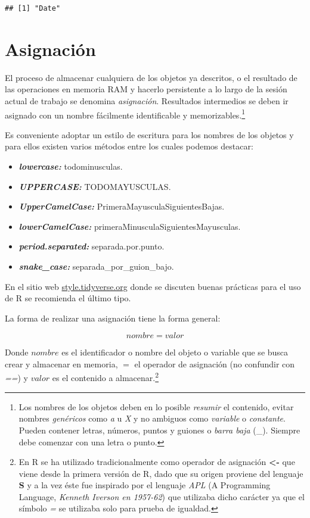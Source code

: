 \documentclass[
]{book}
\providecommand{\tightlist}{%
  \setlength{\itemsep}{0pt}\setlength{\parskip}{0pt}}
\begin{document}
\begin{verbatim}
## [1] "Date"
\end{verbatim}

\hypertarget{asig}{%
\section{Asignación}\label{asig}}

El proceso de almacenar cualquiera de los objetos ya descritos, o el resultado de las operaciones en memoria RAM y hacerlo persistente a lo largo de la sesión actual de trabajo se denomina \emph{asignación}. Resultados intermedios se deben ir asignado con un nombre fácilmente identificable y memorizables.\footnote{Los nombres de los objetos deben en lo posible \emph{resumir} el contenido, evitar nombres \emph{genéricos} como \emph{a} u \emph{X} y no ambiguos como \emph{variable} o \emph{constante}. Pueden contener letras, números, puntos y guiones o \emph{barra baja} (\_). Siempre debe comenzar con una letra o punto.}

Es conveniente adoptar un estilo de escritura para los nombres de los objetos y para ellos existen varios métodos entre los cuales podemos destacar:

\begin{itemize}
\tightlist
\item
  \textbf{\emph{lowercase:}} todominusculas.
\item
  \textbf{\emph{UPPERCASE:}} TODOMAYUSCULAS.
\item
  \textbf{\emph{UpperCamelCase:}} PrimeraMayusculaSiguientesBajas.
\item
  \textbf{\emph{lowerCamelCase:}} primeraMinusculaSiguientesMayusculas.
\item
  \textbf{\emph{period.separated:}} separada.por.punto.
\item
  \textbf{\emph{snake\_case:}} separada\_por\_guion\_bajo.
\end{itemize}

En el sitio web \href{https://style.tidyverse.org/}{style.tidyverse.org} donde se discuten buenas prácticas para el uso de R se recomienda el último tipo.

La forma de realizar una asignación tiene la forma general:

\begin{equation} \label{eq:solve}
nombre = valor
\end{equation}

Donde \(nombre\) es el identificador o nombre del objeto o variable que se busca crear y almacenar en memoria, \(=\) el operador de asignación (no confundir con \emph{==}) y \(valor\) es el contenido a almacenar.\footnote{En R se ha utilizado tradicionalmente como operador de asignación \textbf{\textless-} que viene desde la primera versión de R, dado que su origen proviene del lenguaje \textbf{S} y a la vez éste fue inspirado por el lenguaje \emph{APL} (A Programming Language, \emph{Kenneth Iverson en 1957-62}) que utilizaba dicho carácter ya que el símbolo \emph{=} se utilizaba solo para prueba de igualdad.}
\end{document}
